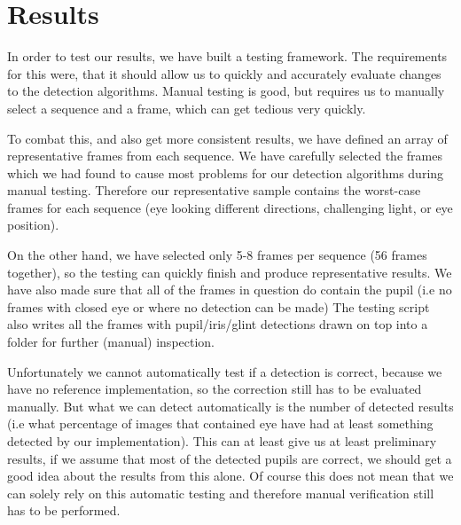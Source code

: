\section{Results}

In order to test our results, we have built a testing framework. The requirements for this were, that it should allow us to quickly and accurately evaluate changes to the detection algorithms. Manual testing is good, but requires us to manually select a sequence and a frame, which can get tedious very quickly.

To combat this, and also get more consistent results, we have defined an array of representative frames from each sequence. We have carefully selected the frames which we had found to cause most problems for our detection algorithms during manual testing. Therefore our representative sample contains the worst-case frames for each sequence (eye looking different directions, challenging light, or eye position). 

On the other hand, we have selected only 5-8 frames per sequence (56 frames together), so the testing can quickly finish and produce representative results. We have also made sure that all of the frames in question do contain the pupil (i.e no frames with closed eye or where no detection can be made) The testing script also writes all the frames with pupil/iris/glint detections drawn on top into a folder for further (manual) inspection.

Unfortunately we cannot automatically test if a detection is correct, because we have no reference implementation, so the correction still has to be evaluated manually. But what we can detect automatically is the number of detected results (i.e what percentage of images that contained eye have had at least something detected by our implementation). This can at least give us  at least preliminary results, if we assume that most of the detected pupils are correct, we should get a good idea about the results from this alone. Of course this does not mean that we can solely rely on this automatic testing and therefore manual verification still has to be performed.

